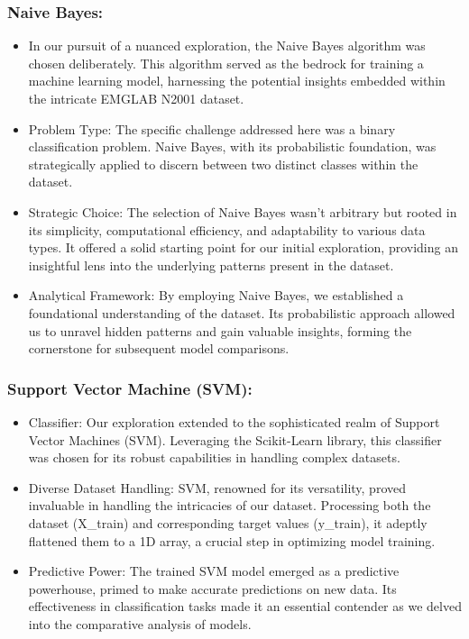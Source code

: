 \documentclass[ 12pt,a4paper,twocolumn,fleqn]{report}
\begin{document}
\subsubsection{Naive Bayes:}
\vspace{2mm}
\begin{itemize}
    \item In our pursuit of a nuanced exploration, the Naive Bayes algorithm was chosen deliberately.
This algorithm served as the bedrock for training a machine learning model, harnessing the
potential insights embedded within the intricate EMGLAB N2001 dataset.
\item Problem Type: The specific challenge addressed here was a binary classification problem.
Naive Bayes, with its probabilistic foundation, was strategically applied to discern between two
distinct classes within the dataset.
\item Strategic Choice: The selection of Naive Bayes wasn't arbitrary but rooted in its simplicity,
computational efficiency, and adaptability to various data types. It offered a solid starting point
for our initial exploration, providing an insightful lens into the underlying patterns present in
the dataset.
\item Analytical Framework: By employing Naive Bayes, we established a foundational
understanding of the dataset. Its probabilistic approach allowed us to unravel hidden patterns
and gain valuable insights, forming the cornerstone for subsequent model comparisons.
\end{itemize}
\subsubsection{Support Vector Machine (SVM):}
\vspace{2mm}
\begin{itemize}
    \item Classifier: Our exploration extended to the sophisticated realm of Support Vector Machines
(SVM). Leveraging the Scikit-Learn library, this classifier was chosen for its robust capabilities
in handling complex datasets.
\item  Diverse Dataset Handling: SVM, renowned for its versatility, proved invaluable in handling the
intricacies of our dataset. Processing both the dataset (X\_train) and corresponding target values
(y\_train), it adeptly flattened them to a 1D array, a crucial step in optimizing model training.
\item Predictive Power: The trained SVM model emerged as a predictive powerhouse, primed to make
accurate predictions on new data. Its effectiveness in classification tasks made it an essential
contender as we delved into the comparative analysis of models.
\end{itemize}
\newpage
  \pagestyle{fancy}
\thisfancypage{%
  \setlength{\fboxsep}{20pt}\doublebox}{}
\normalsize
\end{document}
